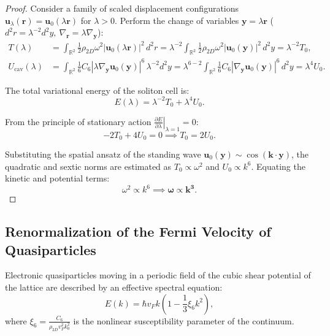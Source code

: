 \documentclass[12pt,a4paper]{article}
\begin{document}
	\begin{proof}
		Consider a family of scaled displacement configurations $\mathbf{u}_\lambda(\mathbf{r}) = \mathbf{u}_0(\lambda \mathbf{r})$ for $\lambda > 0$. Perform the change of variables $\mathbf{y} = \lambda \mathbf{r}$ ($d^2r = \lambda^{-2} d^2y, \ \nabla_\mathbf{r} = \lambda \nabla_\mathbf{y}$):
		\begin{align}
			T(\lambda) &= \int_{\mathbb{R}^2} \frac{1}{2} \rho_{2D} \omega^2 |\mathbf{u}_0(\lambda \mathbf{r})|^2 \, d^2r = \lambda^{-2} \int_{\mathbb{R}^2} \frac{1}{2} \rho_{2D} \omega^2 |\mathbf{u}_0(\mathbf{y})|^2 \, d^2y = \lambda^{-2} T_0, \\
			U_{\text{cav}}(\lambda) &= \int_{\mathbb{R}^2} \frac{1}{6} C_6 |\lambda \nabla_\mathbf{y} \mathbf{u}_0(\mathbf{y})|^6 \, \lambda^{-2} d^2y = \lambda^{6-2} \int_{\mathbb{R}^2} \frac{1}{6} C_6 |\nabla_\mathbf{y} \mathbf{u}_0(\mathbf{y})|^6 \, d^2y = \lambda^4 U_0.
		\end{align}
		
		The total variational energy of the soliton cell is:
		\begin{equation}
			E(\lambda) = \lambda^{-2} T_0 + \lambda^4 U_0.
		\end{equation}
		
		From the principle of stationary action $\left. \frac{\partial E}{\partial \lambda} \right|_{\lambda=1} = 0$:
		\begin{equation}
			-2 T_0 + 4 U_0 = 0 \implies T_0 = 2 U_0.
		\end{equation}
		
		Substituting the spatial ansatz of the standing wave $\mathbf{u}_0(\mathbf{y}) \sim \cos(\mathbf{k} \cdot \mathbf{y})$, the quadratic and sextic norms are estimated as $T_0 \propto \omega^2$ and $U_0 \propto k^6$. Equating the kinetic and potential terms:
		\begin{equation}
			\omega^2 \propto k^6 \implies \mathbf{\omega \propto k^3}.
		\end{equation}
	\end{proof}
	
	\subsection{Renormalization of the Fermi Velocity of Quasiparticles}
	Electronic quasiparticles moving in a periodic field of the cubic shear potential of the lattice are described by an effective spectral equation:
	\begin{equation}
		E(k) = \hbar v_F k \left( 1 - \frac{1}{3} \xi_6 k^2 \right),
	\end{equation}
	where $\xi_6 = \frac{C_6}{\rho_{2D} v_F^2 k_0^2}$ is the nonlinear susceptibility parameter of the continuum.
	
\end{document}
